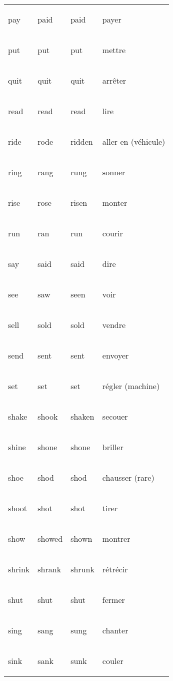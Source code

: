 \documentclass[
]{article}
\begin{document}
\begin{longtable}{>{\bfseries\raggedright\arraybackslash}p{3cm}ll>{\bfseries\raggedright\arraybackslash}p{3cm}}
\rowcolor{gray!6}  pay & paid & paid & payer\\

put & put & put & mettre\\

\rowcolor{gray!6}  quit & quit & quit & arrêter\\

read & read & read & lire\\

\rowcolor{gray!6}  ride & rode & ridden & aller en (véhicule)\\

ring & rang & rung & sonner\\

\rowcolor{gray!6}  rise & rose & risen & monter\\

run & ran & run & courir\\

\rowcolor{gray!6}  say & said & said & dire\\

see & saw & seen & voir\\

\rowcolor{gray!6}  sell & sold & sold & vendre\\

send & sent & sent & envoyer\\

\rowcolor{gray!6}  set & set & set & régler (machine)\\

shake & shook & shaken & secouer\\

\rowcolor{gray!6}  shine & shone & shone & briller\\

shoe & shod & shod & chausser (rare)\\

\rowcolor{gray!6}  shoot & shot & shot & tirer\\

show & showed & shown & montrer\\

\rowcolor{gray!6}  shrink & shrank & shrunk & rétrécir\\

shut & shut & shut & fermer\\

\rowcolor{gray!6}  sing & sang & sung & chanter\\

sink & sank & sunk & couler\\


\end{longtable}
\end{document}
